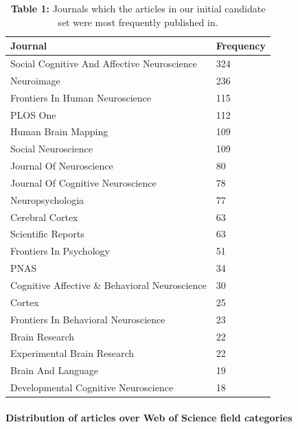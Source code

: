 \documentclass[
  english,
  man,floatsintext]{apa6}
\let\oldparagraph\paragraph
\renewcommand{\paragraph}[1]{\oldparagraph{#1}\mbox{}}
\begin{document}
\begin{table}[tbp]

\begin{center}
\begin{threeparttable}

\caption{\label{tab:tab1}\textbf{Table 1:} Journals which the articles in our initial candidate set were most frequently published in.}

\begin{tabular}{ll}
\toprule
Journal & \multicolumn{1}{c}{Frequency}\\
\midrule
Social Cognitive And Affective Neuroscience & 324\\
Neuroimage & 236\\
Frontiers In Human Neuroscience & 115\\
PLOS One & 112\\
Human Brain Mapping & 109\\
Social Neuroscience & 109\\
Journal Of Neuroscience & 80\\
Journal Of Cognitive Neuroscience & 78\\
Neuropsychologia & 77\\
Cerebral Cortex & 63\\
Scientific Reports & 63\\
Frontiers In Psychology & 51\\
PNAS & 34\\
Cognitive Affective \& Behavioral Neuroscience & 30\\
Cortex & 25\\
Frontiers In Behavioral Neuroscience & 23\\
Brain Research & 22\\
Experimental Brain Research & 22\\
Brain And Language & 19\\
Developmental Cognitive Neuroscience & 18\\
\bottomrule
\end{tabular}

\end{threeparttable}
\end{center}

\end{table}

\hypertarget{distribution-of-articles-over-web-of-science-field-categories}{%
\paragraph{Distribution of articles over Web of Science field categories}\label{distribution-of-articles-over-web-of-science-field-categories}}
\end{document}
